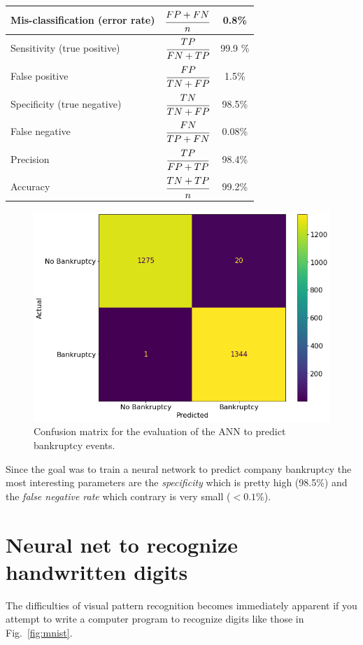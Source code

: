 \makegapedcells\begin{table}[htbp]
\centering
\begin{tabular}{|l|c|c|}
\hline
Mis-classification (error rate) & $\cfrac{FP+FN}{n}$ & 0.8\% \\
\hline
Sensitivity (true positive) & $\cfrac{TP}{FN+TP}$ & 99.9 \% \\
\hline
False positive & $\cfrac{FP}{TN+FP}$ & 1.5\% \\
\hline
Specificity (true negative) & $\cfrac{TN}{TN+FP}$ &  98.5\% \\
\hline
False negative & $\cfrac{FN}{TP+FN}$ & 0.08\% \\
\hline
Precision & $\cfrac{TP}{FP+TP}$ & 98.4\% \\ 
\hline
Accuracy & $\cfrac{TN+TP}{n}$ & 99.2\% \\
\hline
\end{tabular}
\end{table}

\begin{figure}[htbp]
\centering
\includegraphics[width=0.7\linewidth]{figures/confusion_matrix}
\caption{Confusion matrix for the evaluation of the ANN to predict bankruptcy events.}
\label{fig:confusion_matrix}
\end{figure}

Since the goal was to train a neural network to predict company bankruptcy the most interesting parameters are the \emph{specificity} which is pretty high (98.5\%) and the \emph{false negative rate} which contrary is very small ($\lt 0.1\%$).

\section{Neural net to recognize handwritten digits}
\label{neural-net-to-recognize-handwritten-digits}

The difficulties of visual pattern recognition becomes immediately apparent if you attempt to write a computer program to recognize digits like those in Fig.~\ref{fig:mnist}.


